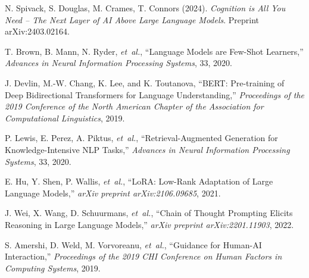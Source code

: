 \documentclass{article}
\begin{document}
\begin{thebibliography}{99}

 N. Spivack, S. Douglas, M. Crames, T. Connors (2024). \textit{Cognition is All You Need -- The Next Layer of AI Above Large Language Models}. Preprint arXiv:2403.02164.

T. Brown, B. Mann, N. Ryder, \emph{et~al.}, ``Language Models are Few-Shot Learners,'' 
\textit{Advances in Neural Information Processing Systems}, 33, 2020.

J. Devlin, M.-W. Chang, K. Lee, and K. Toutanova, ``BERT: Pre-training of Deep Bidirectional Transformers for Language Understanding,''
\textit{Proceedings of the 2019 Conference of the North American Chapter of the Association for Computational Linguistics}, 2019.

P. Lewis, E. Perez, A. Piktus, \emph{et~al.}, ``Retrieval-Augmented Generation for Knowledge-Intensive NLP Tasks,''
\textit{Advances in Neural Information Processing Systems}, 33, 2020.

E. Hu, Y. Shen, P. Wallis, \emph{et~al.}, ``LoRA: Low-Rank Adaptation of Large Language Models,''
\textit{arXiv preprint arXiv:2106.09685}, 2021.

J. Wei, X. Wang, D. Schuurmans, \emph{et~al.}, ``Chain of Thought Prompting Elicits Reasoning in Large Language Models,''
\textit{arXiv preprint arXiv:2201.11903}, 2022.

S. Amershi, D. Weld, M. Vorvoreanu, \emph{et~al.}, ``Guidance for Human-AI Interaction,''
\textit{Proceedings of the 2019 CHI Conference on Human Factors in Computing Systems}, 2019.
\end{thebibliography}
\end{document}
